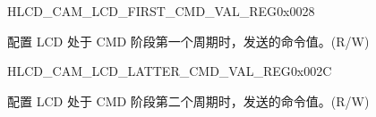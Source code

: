 \begin{register}{H}{LCD\_CAM\_LCD\_FIRST\_CMD\_VAL\_REG}{0x0028}\label{regdesc:LCDCAMLCDFIRSTCMDVALREG}
%
\regnewline%
\begin{regdesc}\begin{reglist}
\label{fielddesc:LCDCAMLCDFIRSTCMDVALUE}\item [LCD\_CAM\_LCD\_FIRST\_CMD\_VALUE] 配置 LCD 处于 CMD 阶段第一个周期时，发送的命令值。(R/W)
\end{reglist}\end{regdesc}
\end{register}

\begin{register}{H}{LCD\_CAM\_LCD\_LATTER\_CMD\_VAL\_REG}{0x002C}\label{regdesc:LCDCAMLCDLATTERCMDVALREG}
%
\regnewline%
\begin{regdesc}\begin{reglist}
\label{fielddesc:LCDCAMLCDLATTERCMDVALUE}\item [LCD\_CAM\_LCD\_LATTER\_CMD\_VALUE] 配置 LCD 处于 CMD 阶段第二个周期时，发送的命令值。(R/W)
\end{reglist}\end{regdesc}
\end{register}
